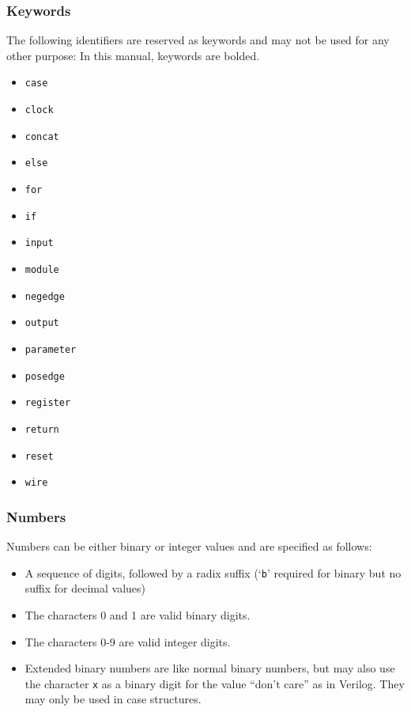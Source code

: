 \documentclass[letterpaper,11pt]{article}
\begin{document}
        \subsubsection{Keywords}
        The following identifiers are reserved as keywords and may not be used for any other purpose: 
        In this manual, keywords are bolded.
        \begin{itemize}
        \item{\texttt{case}}
        \item{\texttt{clock}}
        \item{\texttt{concat}} 
        \item{\texttt{else}}
        \item{\texttt{for}}
        \item{\texttt{if}}
        \item{\texttt{input}}
        \item{\texttt{module}}
        \item{\texttt{negedge}}
        \item{\texttt{output}}
        \item{\texttt{parameter}}
        \item{\texttt{posedge}}
        \item{\texttt{register}}
        \item{\texttt{return}}
        \item{\texttt{reset}}
        \item{\texttt{wire}}
        \end{itemize}
        \subsubsection{Numbers}
        Numbers can be either binary or integer values and are specified as follows: 
        \begin{itemize}
        \item{A sequence of digits, followed by a radix suffix (`\texttt{b}' required for binary but no suffix for decimal values)}
        \item{The characters 0 and 1 are valid binary digits.} 
        \item{The characters 0-9 are valid integer digits.}
        \item{Extended binary numbers are like normal binary numbers, but may also use the
        character \texttt{x} as a binary digit for the value ``don't care'' as in Verilog. They may only be used in case structures.}
        \end{itemize}
\end{document}
